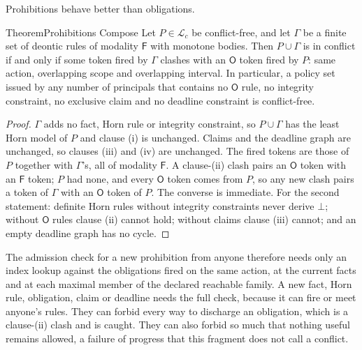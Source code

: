 Prohibitions behave better than obligations.

\begin{pdclaim}{Theorem}{Prohibitions Compose}
\setlength{\parskip}{4pt plus 1pt}
\label{thm:he-prohibitions-compose}
Let $P\in\mathcal{L}_c$ be conflict-free, and let $\Gamma$ be a finite set of
deontic rules of modality $\mathsf{F}$ with monotone bodies. Then
$P\cup\Gamma$ is in conflict if and only if some token fired by $\Gamma$
clashes with an $\mathsf{O}$ token fired by $P$: same action, overlapping
scope and overlapping interval. In particular, a policy set issued by any
number of principals that contains no $\mathsf{O}$ rule, no integrity
constraint, no exclusive claim and no deadline constraint is conflict-free.
\end{pdclaim}
\begin{proof}
\setlength{\parskip}{4pt plus 1pt}
$\Gamma$ adds no fact, Horn rule or integrity constraint, so $P\cup\Gamma$ has
the least Horn model of $P$ and clause (i) is unchanged. Claims and the
deadline graph are unchanged, so clauses (iii) and (iv) are unchanged. The
fired tokens are those of $P$ together with $\Gamma$'s, all of modality
$\mathsf{F}$. A clause-(ii) clash pairs an $\mathsf{O}$ token with an
$\mathsf{F}$ token; $P$ had none, and every $\mathsf{O}$ token comes from $P$,
so any new clash pairs a token of $\Gamma$ with an $\mathsf{O}$ token of $P$.
The converse is immediate. For the second statement: definite Horn rules
without integrity constraints never derive $\bot$; without $\mathsf{O}$ rules
clause (ii) cannot hold; without claims clause (iii) cannot; and an empty
deadline graph has no cycle.
\end{proof}

The admission check for a new prohibition from anyone therefore needs only an
index lookup against the obligations fired on the same action, at the current
facts and at each maximal member of the declared reachable family. A new fact,
Horn rule, obligation, claim or deadline needs the full check, because it can
fire or meet anyone's rules.
They can forbid every way to discharge an obligation, which is a clause-(ii)
clash and is caught. They can also forbid so much that nothing useful remains
allowed, a failure of progress that this fragment does not call a conflict.

